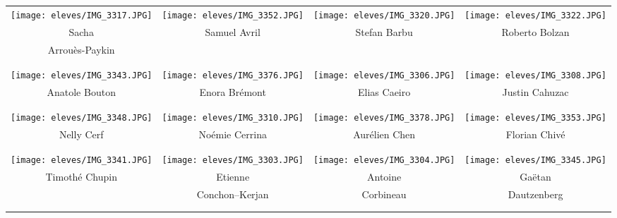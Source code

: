 

\vspace{2mm}
\begin{center}
\begin{tabular}{cccc}
\texttt{[image: eleves/IMG\_3317.JPG]} &
\texttt{[image: eleves/IMG\_3352.JPG]} &
\texttt{[image: eleves/IMG\_3320.JPG]} &
\texttt{[image: eleves/IMG\_3322.JPG]} \\
Sacha & Samuel Avril & Stefan Barbu & Roberto Bolzan \\ Arrouès-Paykin & & & \\ \\ \\ 

\texttt{[image: eleves/IMG\_3343.JPG]} &
\texttt{[image: eleves/IMG\_3376.JPG]} &
\texttt{[image: eleves/IMG\_3306.JPG]} &
\texttt{[image: eleves/IMG\_3308.JPG]} \\
Anatole Bouton & Enora Brémont & Elias Caeiro & Justin Cahuzac \\ \\ \\ 

\texttt{[image: eleves/IMG\_3348.JPG]} &
\texttt{[image: eleves/IMG\_3310.JPG]} &
\texttt{[image: eleves/IMG\_3378.JPG]} &
\texttt{[image: eleves/IMG\_3353.JPG]} \\
Nelly Cerf & Noémie Cerrina & Aurélien Chen & Florian Chivé \\ \\ \\ 

\texttt{[image: eleves/IMG\_3341.JPG]} &
\texttt{[image: eleves/IMG\_3303.JPG]} &
\texttt{[image: eleves/IMG\_3304.JPG]} &
\texttt{[image: eleves/IMG\_3345.JPG]} \\
Timothé Chupin & Etienne & Antoine & Gaëtan \\
 & Conchon--Kerjan & Corbineau &  Dautzenberg \\ \\ \\ 


\end{tabular}
\end{center}
